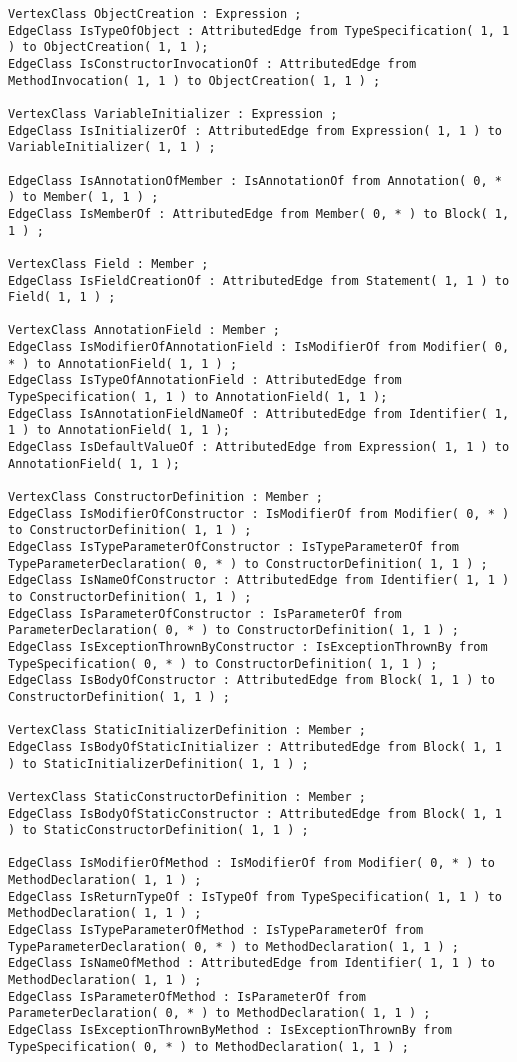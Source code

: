 \begin{lstlisting}[caption=Das im Javaextraktor eingesetzte Schema, label=schema_complete, captionpos=b, style=tgschema]
VertexClass ObjectCreation : Expression ;
EdgeClass IsTypeOfObject : AttributedEdge from TypeSpecification( 1, 1 ) to ObjectCreation( 1, 1 );
EdgeClass IsConstructorInvocationOf : AttributedEdge from MethodInvocation( 1, 1 ) to ObjectCreation( 1, 1 ) ; 

VertexClass VariableInitializer : Expression ;
EdgeClass IsInitializerOf : AttributedEdge from Expression( 1, 1 ) to VariableInitializer( 1, 1 ) ;

EdgeClass IsAnnotationOfMember : IsAnnotationOf from Annotation( 0, * ) to Member( 1, 1 ) ;
EdgeClass IsMemberOf : AttributedEdge from Member( 0, * ) to Block( 1, 1 ) ;

VertexClass Field : Member ;
EdgeClass IsFieldCreationOf : AttributedEdge from Statement( 1, 1 ) to Field( 1, 1 ) ;

VertexClass AnnotationField : Member ;
EdgeClass IsModifierOfAnnotationField : IsModifierOf from Modifier( 0, * ) to AnnotationField( 1, 1 ) ;
EdgeClass IsTypeOfAnnotationField : AttributedEdge from TypeSpecification( 1, 1 ) to AnnotationField( 1, 1 );
EdgeClass IsAnnotationFieldNameOf : AttributedEdge from Identifier( 1, 1 ) to AnnotationField( 1, 1 );
EdgeClass IsDefaultValueOf : AttributedEdge from Expression( 1, 1 ) to AnnotationField( 1, 1 );

VertexClass ConstructorDefinition : Member ;
EdgeClass IsModifierOfConstructor : IsModifierOf from Modifier( 0, * ) to ConstructorDefinition( 1, 1 ) ;
EdgeClass IsTypeParameterOfConstructor : IsTypeParameterOf from TypeParameterDeclaration( 0, * ) to ConstructorDefinition( 1, 1 ) ;
EdgeClass IsNameOfConstructor : AttributedEdge from Identifier( 1, 1 ) to ConstructorDefinition( 1, 1 ) ;
EdgeClass IsParameterOfConstructor : IsParameterOf from ParameterDeclaration( 0, * ) to ConstructorDefinition( 1, 1 ) ;
EdgeClass IsExceptionThrownByConstructor : IsExceptionThrownBy from TypeSpecification( 0, * ) to ConstructorDefinition( 1, 1 ) ;
EdgeClass IsBodyOfConstructor : AttributedEdge from Block( 1, 1 ) to ConstructorDefinition( 1, 1 ) ;

VertexClass StaticInitializerDefinition : Member ;
EdgeClass IsBodyOfStaticInitializer : AttributedEdge from Block( 1, 1 ) to StaticInitializerDefinition( 1, 1 ) ;

VertexClass StaticConstructorDefinition : Member ;
EdgeClass IsBodyOfStaticConstructor : AttributedEdge from Block( 1, 1 ) to StaticConstructorDefinition( 1, 1 ) ;

EdgeClass IsModifierOfMethod : IsModifierOf from Modifier( 0, * ) to MethodDeclaration( 1, 1 ) ;
EdgeClass IsReturnTypeOf : IsTypeOf from TypeSpecification( 1, 1 ) to MethodDeclaration( 1, 1 ) ;
EdgeClass IsTypeParameterOfMethod : IsTypeParameterOf from TypeParameterDeclaration( 0, * ) to MethodDeclaration( 1, 1 ) ;
EdgeClass IsNameOfMethod : AttributedEdge from Identifier( 1, 1 ) to MethodDeclaration( 1, 1 ) ;
EdgeClass IsParameterOfMethod : IsParameterOf from ParameterDeclaration( 0, * ) to MethodDeclaration( 1, 1 ) ;
EdgeClass IsExceptionThrownByMethod : IsExceptionThrownBy from TypeSpecification( 0, * ) to MethodDeclaration( 1, 1 ) ;


\end{lstlisting}
